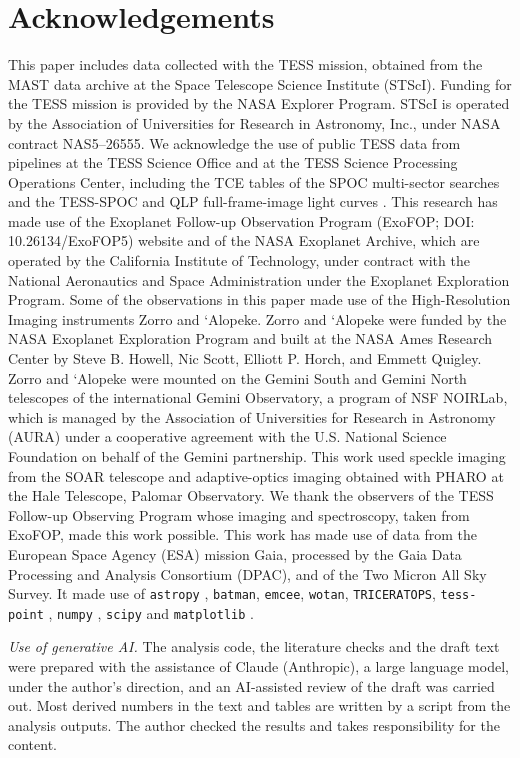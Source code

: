 \documentclass[twocolumn,numberedappendix,appendixfloats]{openjournal}
\begin{document}
\section*{Acknowledgements}
This paper includes data collected with the TESS mission, obtained from the
MAST data archive at the Space Telescope Science Institute (STScI). Funding for
the TESS mission is provided by the NASA Explorer Program. STScI is operated by
the Association of Universities for Research in Astronomy, Inc., under NASA
contract NAS5--26555. We acknowledge the use of public TESS data from pipelines
at the TESS Science Office and at the TESS Science Processing Operations
Center, including the TCE tables of the SPOC multi-sector searches and the
TESS-SPOC and QLP full-frame-image light curves
\citep{caldwell2020,huang2020,huang2020b}. This research has made use of the Exoplanet
Follow-up Observation Program (ExoFOP; DOI: 10.26134/ExoFOP5) website and of
the NASA Exoplanet Archive, which are operated by the California Institute of
Technology, under contract with the National Aeronautics and Space
Administration under the Exoplanet Exploration Program. Some of the
observations in this paper made use of the High-Resolution Imaging instruments
Zorro and {`}Alopeke. Zorro and {`}Alopeke were funded by the NASA Exoplanet
Exploration Program and built at the NASA Ames Research Center by Steve B.
Howell, Nic Scott, Elliott P. Horch, and Emmett Quigley. Zorro and {`}Alopeke
were mounted on the Gemini South and Gemini North telescopes of the
international Gemini Observatory, a program of NSF NOIRLab, which is managed by
the Association of Universities for Research in Astronomy (AURA) under a
cooperative agreement with the U.S. National Science Foundation on behalf of
the Gemini partnership. This work used speckle imaging from the SOAR telescope
and adaptive-optics imaging obtained with PHARO at the Hale Telescope, Palomar
Observatory. We thank the observers of the TESS Follow-up Observing Program
whose imaging and spectroscopy, taken from ExoFOP, made this work possible.
This work has made use of data from the European Space Agency (ESA) mission
Gaia, processed by the Gaia Data Processing and Analysis Consortium (DPAC), and
of the Two Micron All Sky Survey. It made use of \texttt{astropy}
\citep{astropy2022}, \texttt{batman}, \texttt{emcee}, \texttt{wotan},
\texttt{TRICERATOPS}, \texttt{tess-point} \citep{burke2020},
\texttt{numpy} \citep{harris2020}, \texttt{scipy} \citep{virtanen2020} and
\texttt{matplotlib} \citep{hunter2007}.

\emph{Use of generative AI.} The analysis code, the literature checks and the
draft text were prepared with the assistance of Claude (Anthropic), a large
language model, under the author's direction, and an AI-assisted review of the
draft was carried out. Most derived numbers in the text and tables are written by a script from the
analysis outputs. The author checked the
results and takes responsibility for the content.
\end{document}
